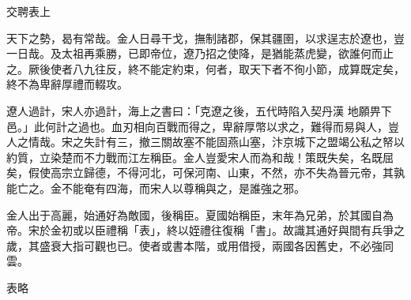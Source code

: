 
\begin{pinyinscope}

 交聘表上



 天下之勢，曷有常哉。金人日尋干戈，撫制諸郡，保其疆圉，以求逞志於遼也，豈一日哉。及太祖再乘勝，已即帝位，遼乃招之使降，是猶能蒸虎變，欲誰何而止之。厥後使者八九往反，終不能定約束，何者，取天下者不徇小節，成算既定矣，終不為卑辭厚禮而輟攻。



 遼人過計，宋人亦過計，海上之書曰：「克遼之後，五代時陷入契丹漢
 地願畀下邑。」此何計之過也。血刃相向百戰而得之，卑辭厚幣以求之，難得而易與人，豈人之情哉。宋之失計有三，撤三關故塞不能固燕山塞，汴京城下之盟竭公私之帑以約質，立染楚而不力戰而江左稱臣。金人豈愛宋人而為和哉！策既失矣，名既屈矣，假使高宗立歸德，不得河北，可保河南、山東，不然，亦不失為晉元帝，其孰能亡之。金不能奄有四海，而宋人以尊稱與之，是誰強之邪。



 金人出于高麗，始通好為敵國，後稱臣。夏國始稱臣，末年為兄弟，於其國自為帝。宋於金初或以臣禮稱「表」，終以姪禮往復稱「書」。故識其通好與間有兵爭之
 歲，其盛衰大指可觀也已。使者或書本階，或用借授，兩國各因舊史，不必強同雲。



 表略



\end{pinyinscope}